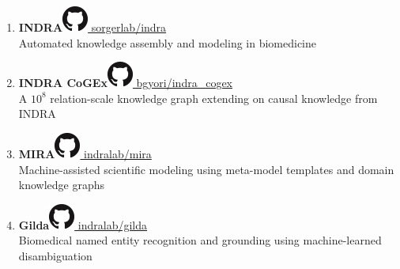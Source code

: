 \documentclass[10pt,a4paper,sans]{moderncv} %
\begin{document}
\begin{enumerate}
        \item \textbf{INDRA}\hfill\href{https://github.com/sorgerlab/indra}{\includegraphics[scale=0.25]{img/GitHub-Mark-32px} sorgerlab/indra}
\\
    Automated knowledge assembly and modeling in biomedicine

        \item \textbf{INDRA CoGEx}\hfill\href{https://github.com/bgyori/indra\_cogex}{\includegraphics[scale=0.25]{img/GitHub-Mark-32px} bgyori/indra\_cogex}
\\
    A $10^8$ relation-scale knowledge graph extending on causal knowledge from INDRA

        \item \textbf{MIRA}\hfill\href{https://github.com/indralab/mira}{\includegraphics[scale=0.25]{img/GitHub-Mark-32px} indralab/mira}
\\
    Machine-assisted scientific modeling using meta-model templates and domain knowledge graphs

        \item \textbf{Gilda}\hfill\href{https://github.com/indralab/gilda}{\includegraphics[scale=0.25]{img/GitHub-Mark-32px} indralab/gilda}
\\
    Biomedical named entity recognition and grounding using machine-learned disambiguation

    \end{enumerate}
\end{document}
